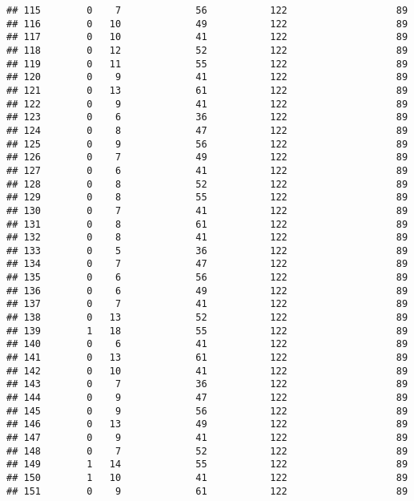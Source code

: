 \documentclass[]{article}
\begin{document}
\begin{verbatim}
## 115        0    7             56           122                   89
## 116        0   10             49           122                   89
## 117        0   10             41           122                   89
## 118        0   12             52           122                   89
## 119        0   11             55           122                   89
## 120        0    9             41           122                   89
## 121        0   13             61           122                   89
## 122        0    9             41           122                   89
## 123        0    6             36           122                   89
## 124        0    8             47           122                   89
## 125        0    9             56           122                   89
## 126        0    7             49           122                   89
## 127        0    6             41           122                   89
## 128        0    8             52           122                   89
## 129        0    8             55           122                   89
## 130        0    7             41           122                   89
## 131        0    8             61           122                   89
## 132        0    8             41           122                   89
## 133        0    5             36           122                   89
## 134        0    7             47           122                   89
## 135        0    6             56           122                   89
## 136        0    6             49           122                   89
## 137        0    7             41           122                   89
## 138        0   13             52           122                   89
## 139        1   18             55           122                   89
## 140        0    6             41           122                   89
## 141        0   13             61           122                   89
## 142        0   10             41           122                   89
## 143        0    7             36           122                   89
## 144        0    9             47           122                   89
## 145        0    9             56           122                   89
## 146        0   13             49           122                   89
## 147        0    9             41           122                   89
## 148        0    7             52           122                   89
## 149        1   14             55           122                   89
## 150        1   10             41           122                   89
## 151        0    9             61           122                   89

\end{verbatim}
\end{document}
